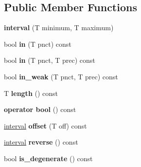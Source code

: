\subsection*{Public Member Functions}
\begin{DoxyCompactItemize}
\item 
{\bfseries interval} (T minimum, T maximum)\hypertarget{classgxx_1_1math_1_1interval_a1dcb0c5fd6571b3015044d20bc426387}{}\label{classgxx_1_1math_1_1interval_a1dcb0c5fd6571b3015044d20bc426387}

\item 
bool {\bfseries in} (T pnct) const \hypertarget{classgxx_1_1math_1_1interval_a21d5b8f8423dea8e65cd32f724f6f5f8}{}\label{classgxx_1_1math_1_1interval_a21d5b8f8423dea8e65cd32f724f6f5f8}

\item 
bool {\bfseries in} (T pnct, T prec) const \hypertarget{classgxx_1_1math_1_1interval_af210817a80079cc339d81fe800ac5407}{}\label{classgxx_1_1math_1_1interval_af210817a80079cc339d81fe800ac5407}

\item 
bool {\bfseries in\+\_\+weak} (T pnct, T prec) const \hypertarget{classgxx_1_1math_1_1interval_add828a8006c2d9e735640f7e093e7d7a}{}\label{classgxx_1_1math_1_1interval_add828a8006c2d9e735640f7e093e7d7a}

\item 
T {\bfseries length} () const \hypertarget{classgxx_1_1math_1_1interval_a4832b09e7b45292d04c12d4ffb9c4dad}{}\label{classgxx_1_1math_1_1interval_a4832b09e7b45292d04c12d4ffb9c4dad}

\item 
{\bfseries operator bool} () const \hypertarget{classgxx_1_1math_1_1interval_ae8791d04fdcfea2d23c73f87df4ab376}{}\label{classgxx_1_1math_1_1interval_ae8791d04fdcfea2d23c73f87df4ab376}

\item 
\hyperlink{classgxx_1_1math_1_1interval}{interval} {\bfseries offset} (T off) const \hypertarget{classgxx_1_1math_1_1interval_a3e48d6860460a806b69de1692c403e48}{}\label{classgxx_1_1math_1_1interval_a3e48d6860460a806b69de1692c403e48}

\item 
\hyperlink{classgxx_1_1math_1_1interval}{interval} {\bfseries reverse} () const \hypertarget{classgxx_1_1math_1_1interval_afc2e560d5a0cefe858687db39c83f96f}{}\label{classgxx_1_1math_1_1interval_afc2e560d5a0cefe858687db39c83f96f}

\item 
bool {\bfseries is\+\_\+degenerate} () const \hypertarget{classgxx_1_1math_1_1interval_a2c02909c2df7a7ccb8d0039385266aae}{}\label{classgxx_1_1math_1_1interval_a2c02909c2df7a7ccb8d0039385266aae}


\end{DoxyCompactItemize}
